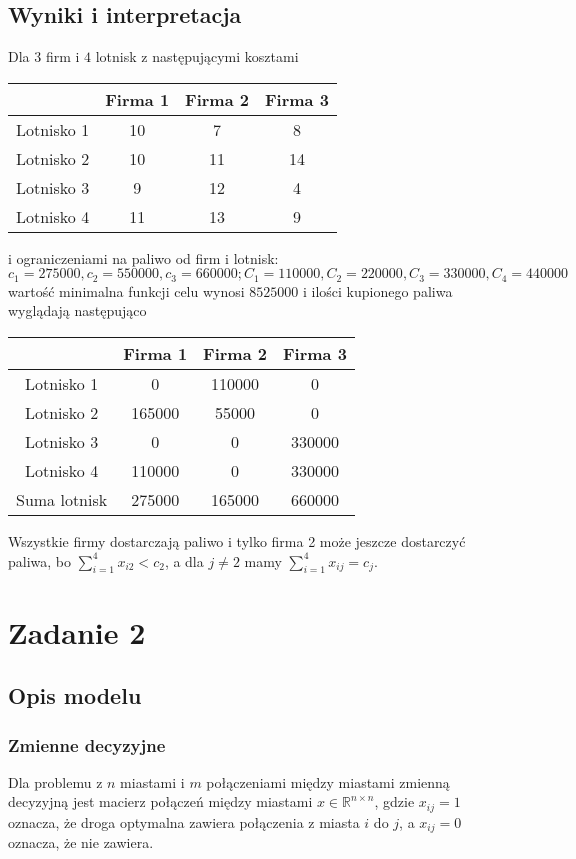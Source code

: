 \documentclass{article}
\begin{document}
\subsection{Wyniki i interpretacja}
Dla $3$ firm i $4$ lotnisk z następującymi kosztami
\begin{center}
\begin{tabular}{| c | c c c |}
\hline
 & Firma 1 & Firma 2 & Firma 3\\
 \hline
Lotnisko 1 & 10 & 7 & 8\\
Lotnisko 2 & 10 & 11 & 14\\
Lotnisko 3 & 9 & 12 & 4\\
Lotnisko 4 & 11 & 13 & 9\\
\hline
\end{tabular}
\end{center}
i ograniczeniami na paliwo od firm i lotnisk:
$$c_1=275000, c_2=550000, c_3=660000; C_1=110000, C_2=220000, C_3=330000, C_4=440000$$ 
wartość minimalna funkcji celu wynosi $8525000$ i ilości kupionego paliwa wyglądają następująco
\begin{center}
\begin{tabular}{| c | c | c | c |}
\hline
 & Firma 1 & Firma 2 & Firma 3\\
 \hline
Lotnisko 1 & 0 & 110000 & 0\\
\hline
Lotnisko 2 & 165000 & 55000 & 0 \\
\hline
Lotnisko 3 & 0 & 0 & 330000 \\
\hline
Lotnisko 4 & 110000 &  0 & 330000 \\
\hline
\hline 
Suma lotnisk & 275000 &  165000 & 660000\\
\hline
\end{tabular}
\end{center}
Wszystkie firmy dostarczają paliwo i tylko firma 2 może jeszcze dostarczyć paliwa, bo $\sum_{i=1}^4 x_{i2} < c_2$, a dla $j\neq 2$ mamy  $\sum_{i=1}^4 x_{ij} = c_j$.




\section{Zadanie 2}
\subsection{Opis modelu}
\subsubsection{Zmienne decyzyjne}
Dla problemu z $n$ miastami i $m$ połączeniami między miastami zmienną decyzyjną jest macierz połączeń między miastami $x\in \mathbb{R}^{n\times n}$, gdzie $x_{ij} = 1$ oznacza, że droga optymalna zawiera połączenia z miasta $i$ do $j$, a $x_{ij} = 0$ oznacza, że nie zawiera.
\end{document}

